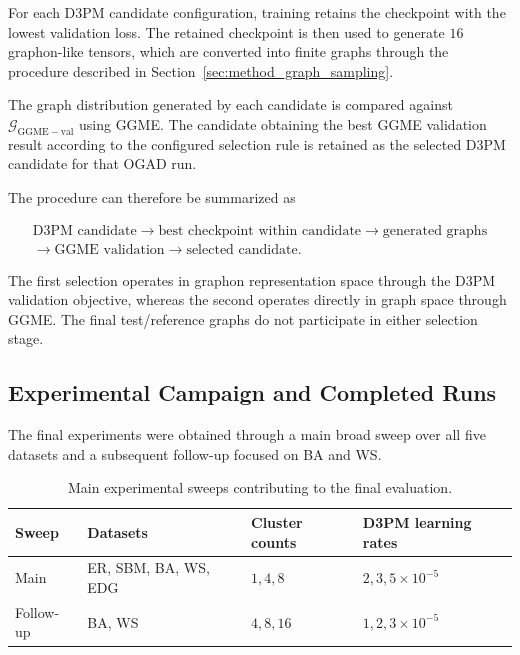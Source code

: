 For each D3PM candidate configuration, training retains the checkpoint with the lowest validation loss. The retained checkpoint is then used to generate \(16\) graphon-like tensors, which are converted into finite graphs through the procedure described in Section~\ref{sec:method_graph_sampling}.

The graph distribution generated by each candidate is compared against \(\mathcal{G}_{\mathrm{GGME-val}}\) using GGME. The candidate obtaining the best GGME validation result according to the configured selection rule is retained as the selected D3PM candidate for that OGAD run.

The procedure can therefore be summarized as

\[
\begin{gathered}
\text{D3PM candidate}
\longrightarrow
\text{best checkpoint within candidate}
\longrightarrow
\text{generated graphs}
\\[0.4em]
\longrightarrow
\text{GGME validation}
\longrightarrow
\text{selected candidate}.
\end{gathered}
\]

The first selection operates in graphon representation space through the D3PM validation objective, whereas the second operates directly in graph space through GGME. The final test/reference graphs do not participate in either selection stage.


\subsection{Experimental Campaign and Completed Runs}
\label{subsec:exp_campaign}

The final experiments were obtained through a main broad sweep over all five datasets and a subsequent follow-up focused on BA and WS.

\begin{table}[htbp]
    \centering
    \caption{Main experimental sweeps contributing to the final evaluation.}
    \label{tab:exp_campaigns}
    \begin{tabular}{llll}
        \hline
        Sweep & Datasets & Cluster counts & D3PM learning rates \\
        \hline
        Main & ER, SBM, BA, WS, EDG
        & \(1,4,8\)
        & \(2,3,5\times10^{-5}\) \\
        Follow-up & BA, WS
        & \(4,8,16\)
        & \(1,2,3\times10^{-5}\) \\
        \hline
    \end{tabular}
\end{table}

